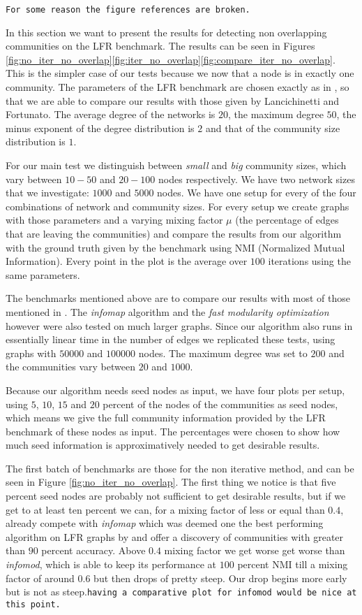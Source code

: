 \texttt{For some reason the figure references are broken.}

In this section we want to present the results for detecting non overlapping communities on the LFR benchmark. The results can be seen in Figures \ref{fig:no_iter_no_overlap}\ref{fig:iter_no_overlap}\ref{fig:compare_iter_no_overlap}. This is the simpler case of our tests because we now that a node is in exactly one community. The parameters of the LFR benchmark are chosen exactly as in \cite{LF09}, so that we are able to compare our results with those given by Lancichinetti and Fortunato. The average degree of the networks is $20$, the maximum degree $50$, the minus exponent of the degree distribution is $2$ and that of the community size distribution is $1$.

For our main test we distinguish between \textit{small} and \textit{big} community sizes, which vary between $10 - 50$ and $20 - 100$ nodes respectively. We have two network sizes that we investigate: $1000$ and $5000$ nodes. We have one setup for every of the four combinations of network and community sizes. For every setup we create graphs with those parameters and a varying mixing factor $\mu$ (the percentage of edges that are leaving the communities) and compare the results from our algorithm with the ground truth given by the benchmark using NMI (Normalized Mutual Information). Every point in the plot is the average over $100$ iterations using the same parameters. 

The benchmarks mentioned above are to compare our results with most of those mentioned in \cite{LF09}. The \textit{infomap} algorithm \cite{RB08} and the \textit{fast modularity optimization} \cite{BGLL08} however were also tested on much larger graphs.
Since our algorithm also runs in essentially linear time in the number of edges we replicated these tests, using graphs with $50000$ and $100000$ nodes. The maximum degree was set to $200$ and the communities vary between $20$ and $1000$.

Because our algorithm needs seed nodes as input, we have four plots per setup, using $5$, $10$, $15$ and $20$ percent of the nodes of the communities as seed nodes, which means we give the full community information provided by the LFR benchmark of these nodes as input. The percentages were chosen to show how much seed information is approximatively needed to get desirable results.

The first batch of benchmarks are those for the non iterative method, and can be seen in Figure \ref{fig:no_iter_no_overlap}. The first thing we notice is that five percent seed nodes are probably not sufficient to get desirable results, but if we get to at least ten percent we can, for a mixing factor of less or equal than $0.4$, already compete with \textit{infomap} which was deemed one the best performing algorithm on LFR graphs by \cite{LF09} and offer a discovery of communities with greater than $90$ percent accuracy. Above $0.4$ mixing factor we get worse get worse than \textit{infomod}, which is able to keep its performance at $100$ percent NMI till a mixing factor of around $0.6$ but then drops of pretty steep. Our drop begins more early but is not as steep.\texttt{having a comparative plot for infomod would be nice at this point.}

